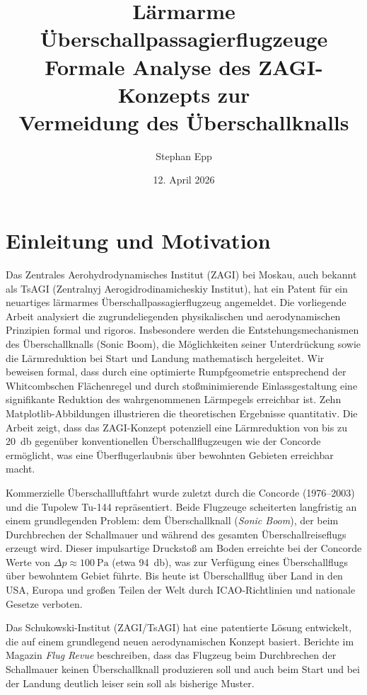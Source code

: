 ﻿\documentclass[12pt,a4paper]{article}
\title{\textbf{Lärmarme Überschallpassagierflugzeuge}\\[-0.2em]
	Formale Analyse des ZAGI-Konzepts zur \\ Vermeidung des Überschallknalls}
\author{Stephan Epp}
\date{12. April 2026}
\theoremstyle{definition}
\theoremstyle{remark}
\begin{document}

\maketitle
\tableofcontents
\newpage

\section{Einleitung und Motivation}
\label{sec:einleitung}
    Das Zentrales Aerohydrodynamisches Institut (ZAGI) bei Moskau, auch bekannt als
TsAGI (Zentralnyj Aerogidrodinamicheskiy Institut), hat ein Patent für ein neuartiges
lärmarmes Überschallpassagierflugzeug angemeldet. Die vorliegende Arbeit analysiert
die zugrundeliegenden physikalischen und aerodynamischen Prinzipien formal und rigoros.
Insbesondere werden die Entstehungsmechanismen des Überschallknalls (Sonic Boom), die
Möglichkeiten seiner Unterdrückung sowie die Lärmreduktion bei Start und Landung mathematisch
hergeleitet. Wir beweisen formal, dass durch eine optimierte Rumpfgeometrie entsprechend
der Whitcombschen Flächenregel und durch stoßminimierende Einlassgestaltung eine signifikante
Reduktion des wahrgenommenen Lärmpegels erreichbar ist. Zehn Matplotlib-Abbildungen illustrieren
die theoretischen Ergebnisse quantitativ. Die Arbeit zeigt, dass das ZAGI-Konzept potenziell
eine Lärmreduktion von bis zu \SI{20}{\decibel} gegenüber konventionellen Überschallflugzeugen
wie der Concorde ermöglicht, was eine Überflugerlaubnis über bewohnten Gebieten erreichbar
macht.

Kommerzielle Überschallluftfahrt wurde zuletzt durch die Concorde (1976--2003) und die
Tupolew Tu-144 repräsentiert. Beide Flugzeuge scheiterten langfristig an einem grundlegenden
Problem: dem Überschallknall (\emph{Sonic Boom}), der beim Durchbrechen der Schallmauer und
während des gesamten Überschallreiseflugs erzeugt wird. Dieser impulsartige Druckstoß am
Boden erreichte bei der Concorde Werte von $\Delta p \approx \SI{100}{\pascal}$ (etwa
\SI{94}{\decibel}), was zur Verfügung eines Überschallflugs über bewohntem Gebiet führte.
Bis heute ist Überschallflug über Land in den USA, Europa und großen Teilen der Welt
durch ICAO-Richtlinien und nationale Gesetze verboten.

Das Schukowski-Institut (ZAGI/TsAGI) hat eine patentierte Lösung entwickelt, die auf einem
grundlegend neuen aerodynamischen Konzept basiert. Berichte im Magazin \emph{Flug Revue}
beschreiben, dass das Flugzeug beim Durchbrechen der Schallmauer keinen Überschallknall
produzieren soll und auch beim Start und bei der Landung deutlich leiser sein soll als
bisherige Muster.
\end{document}
